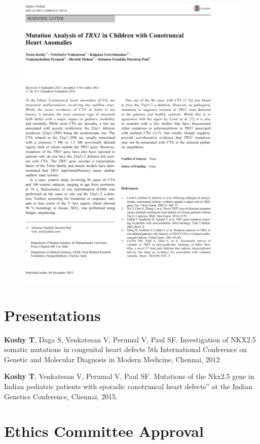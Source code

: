 \begin{figure}[!h]
\includegraphics[width=\linewidth,height=\textheight,keepaspectratio]{Appendices/Pub3.pdf}
\end{figure}

\chapter{Presentations}

\textbf{Koshy T}, Daga S, Venkatesan V, Perumal V, Paul SF. Investigation of NKX2.5 somatic mutations in congenital heart defects 5th International Conference on Genetic and Molecular Diagnosis in Modern Medicine, Chennai, 2012

\textbf{Koshy T}, Venkatesan V, Perumal V, Paul SF. Mutations of the Nkx2.5 gene in Indian pediatric patients with sporadic conotruncal heart defects” at the Indian Genetics Conference, Chennai, 2015.

\cleardoublepage

\chapter{Ethics Committee Approval}

